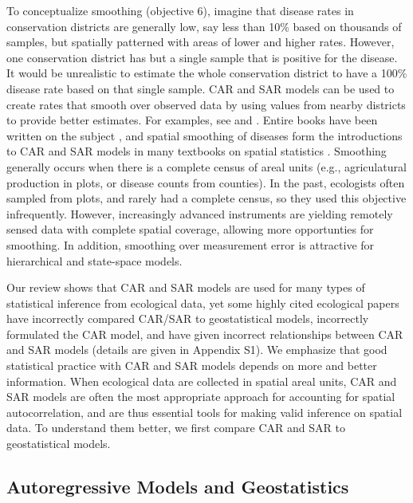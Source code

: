 \documentclass[11pt, titlepage]{article}\usepackage[]{graphicx}\usepackage[]{color}
\begin{document}
\begin{spacing}{1.9}
\begin{flushleft}
To conceptualize smoothing (objective 6), imagine that disease rates in conservation districts are generally low, say less than 10\% based on thousands of samples, but spatially patterned with areas of lower and higher rates.  However, one conservation district has but a single sample that is positive for the disease.  It would be unrealistic to estimate the whole conservation district to have a 100\% disease rate based on that single sample. CAR and SAR models can be used to create rates that smooth over observed data by using values from nearby districts to provide better estimates. For examples, see \citet{Begu:Mart:Rue:Cumm:hier:2012} and \citet{Evan:Kirc:Eyle:Ryan:Walt:habi:2016}. Entire books have been written on the subject \citep[e.g.,][]{Elli:Wake:Best:Brig:2000,Pfei:Robi:Stev:Stev:Roge:spat:2008,Laws:stat:2013}, and spatial smoothing of diseases form the introductions to CAR and SAR models in many textbooks on spatial statistics \citep{Cres:stat:1993,Wall:Gotw:appl:2004, Scha:Gotw:stat:2005, Bane:Carl:Gelf:hier:2014}.  Smoothing generally occurs when there is a complete census of areal units (e.g., agriculatural production in plots, or disease counts from counties). In the past, ecologists often sampled from plots, and rarely had a complete census, so they used this objective infrequently. However, increasingly advanced instruments \citep[e.g., LIDAR, ][]{Camp:Wynn:intr:2011} are yielding remotely sensed data with complete spatial coverage, allowing more opportunties for smoothing.  In addition, smoothing over measurement error is attractive for hierarchical \citep{Cres:Cald:Clar:VerH:acco:2009} and state-space \citep{deVa:Hast:fitt:2002} models.

Our review shows that CAR and SAR models are used for many types of statistical inference from ecological data, yet some highly cited ecological papers have incorrectly compared CAR/SAR to geostatistical models, incorrectly formulated the CAR model, and have given incorrect relationships between CAR and SAR models (details are given in Appendix S1). We emphasize that good statistical practice with CAR and SAR models depends on more and better information.  When ecological data are collected in spatial areal units, CAR and SAR models are often the most appropriate approach for accounting for spatial autocorrelation, and are thus essential tools for making valid inference on spatial data.   To understand them better, we first compare CAR and SAR to geostatistical models.

\subsection*{Autoregressive Models and Geostatistics}


\end{flushleft}
\end{spacing}
\end{document}

